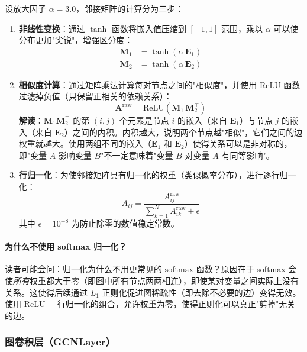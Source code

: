 \documentclass[UTF8]{ctexart}
\begin{document}
设放大因子 $\alpha=3.0$，邻接矩阵的计算分为三步：
\begin{enumerate}
    \item \textbf{非线性变换}：通过 $\tanh$ 函数将嵌入值压缩到 $[-1, 1]$ 范围，乘以 $\alpha$ 可以使分布更加"尖锐"，增强区分度：
    \begin{align}
        \mathbf{M}_1 &= \tanh(\alpha \, \mathbf{E}_1) \\
        \mathbf{M}_2 &= \tanh(\alpha \, \mathbf{E}_2)
    \end{align}

    \item \textbf{相似度计算}：通过矩阵乘法计算每对节点之间的"相似度"，并使用 ReLU 函数过滤掉负值（只保留正相关的依赖关系）：
    \begin{equation}
        \mathbf{A}^{\text{raw}} = \mathrm{ReLU}\!\left(\mathbf{M}_1 \, \mathbf{M}_2^\top\right)
    \end{equation}
    \textbf{解读}：$\mathbf{M}_1 \mathbf{M}_2^\top$ 的第 $(i,j)$ 个元素是节点 $i$ 的嵌入（来自 $\mathbf{E}_1$）与节点 $j$ 的嵌入（来自 $\mathbf{E}_2$）之间的内积。内积越大，说明两个节点越"相似"，它们之间的边权重就越大。使用两组不同的嵌入（$\mathbf{E}_1$ 和 $\mathbf{E}_2$）使得关系可以是非对称的，即"变量 $A$ 影响变量 $B$"不一定意味着"变量 $B$ 对变量 $A$ 有同等影响"。

    \item \textbf{行归一化}：为使邻接矩阵具有归一化的权重（类似概率分布），进行逐行归一化：
    \begin{equation}
        A_{ij} = \frac{A_{ij}^{\text{raw}}}{\sum_{k=1}^{N} A_{ik}^{\text{raw}} + \epsilon}
    \end{equation}
    其中 $\epsilon = 10^{-8}$ 为防止除零的数值稳定常数。
\end{enumerate}

\paragraph{为什么不使用 softmax 归一化？}

读者可能会问：归一化为什么不用更常见的 $\mathrm{softmax}$ 函数？原因在于 softmax 会使\emph{所有}权重都大于零（即图中所有节点两两相连），即使某对变量之间实际上没有关系。这使得后续通过 $L_1$ 正则化促进图稀疏性（即去除不必要的边）变得无效。使用 ReLU + 行归一化的组合，允许权重为零，使得正则化可以真正"剪掉"无关的边。

\subsubsection{图卷积层（GCNLayer）}
\end{document}
